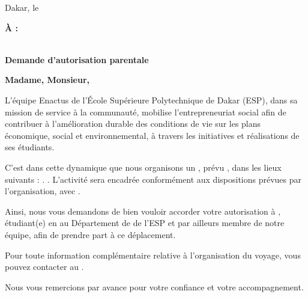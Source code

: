 \documentclass[11pt,a4paper]{article}
\begin{document}
\MakeLetterStart
\begin{flushright}Dakar, le \LetterDate\end{flushright}
\vspace{1mm}
\begin{flushright}\textbf{À : \ParentRecipient}\end{flushright}
\vspace{2mm}
 \DocReference\\
 \textbf{Demande d'autorisation parentale}
\vspace{3mm}

\textbf{Madame, Monsieur,}

\justifying
L'équipe Enactus de l'École Supérieure Polytechnique de Dakar (ESP), dans sa mission de service à la communauté, mobilise l'entrepreneuriat social afin de contribuer à l'amélioration durable des conditions de vie sur les plans économique, social et environnemental, à travers les initiatives et réalisations de ses étudiants.

C'est dans cette dynamique que nous organisons un \textbf{\TripPurpose}, prévu \textbf{\TravelPeriod}, dans les lieux suivants : \textbf{\TravelLocations}. \TravelFunding. L'activité sera encadrée conformément aux dispositions prévues par l'organisation, avec \OrderMissionInfo.

\TravelLogistics

Ainsi, nous vous demandons de bien vouloir accorder votre autorisation à \textbf{\ParticipantName}, étudiant(e) en \textbf{\ParticipantClass} au Département de \textbf{\ParticipantDepartment} de l'ESP et par ailleurs membre de notre équipe, afin de prendre part à ce déplacement.

Pour toute information complémentaire relative à l'organisation du voyage, vous pouvez contacter \TripContactName{} au \TripContactPhone.

Nous vous remercions par avance pour votre confiance et votre accompagnement.

\SingleSignature{\SignerRole}{\SignerName}{\SignerPhone}
\end{document}
